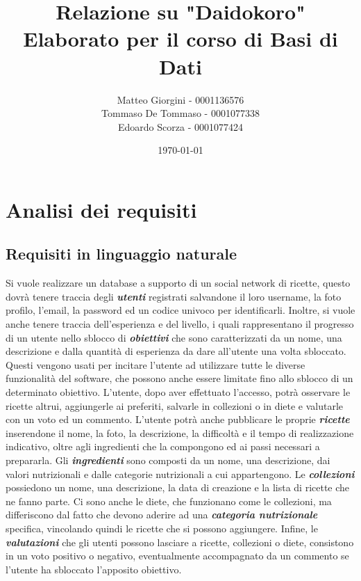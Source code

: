 ﻿\documentclass[a4paper,12pt]{report}
\title{Relazione su "Daidokoro" \\ Elaborato per il corso di Basi di Dati}
\author
{
    Matteo Giorgini - 0001136576 \\
    Tommaso De Tommaso - 0001077338 \\
    Edoardo Scorza - 0001077424 \\
}
\date{\today}
\begin{document}
\maketitle
\tableofcontents
\chapter{Analisi dei requisiti}
\section{Requisiti in linguaggio naturale}
Si vuole realizzare un database a supporto di un social network di ricette, questo dovrà tenere traccia degli \textbf{\textit{utenti}} registrati salvandone il loro username, la foto profilo, l'email, la password ed un codice univoco per identificarli.
Inoltre, si vuole anche tenere traccia dell'esperienza e del livello, i quali rappresentano il progresso di un utente nello sblocco di \textbf{\textit{obiettivi}} che sono caratterizzati da un nome, una descrizione e dalla quantità di esperienza da dare all'utente una volta sbloccato.
Questi vengono usati per incitare l'utente ad utilizzare tutte le diverse funzionalità del software, che possono anche essere limitate fino allo sblocco di un determinato obiettivo.
L'utente, dopo aver effettuato l'accesso, potrà osservare le ricette altrui, aggiungerle ai preferiti, salvarle in collezioni o in diete e valutarle con un voto ed un commento.
L'utente potrà anche pubblicare le proprie \textbf{\textit{ricette}} inserendone il nome, la foto, la descrizione, la difficoltà e il tempo di realizzazione indicativo, oltre agli ingredienti che la compongono ed ai passi necessari a prepararla.
Gli \textbf{\textit{ingredienti}} sono composti da un nome, una descrizione, dai valori nutrizionali e dalle categorie nutrizionali a cui appartengono.
Le \textbf{\textit{collezioni}} possiedono un nome, una descrizione, la data di creazione e la lista di ricette che ne fanno parte.
Ci sono anche le diete, che funzionano come le collezioni, ma differiscono dal fatto che devono aderire ad una \textbf{\textit{categoria nutrizionale}} specifica, vincolando quindi le ricette che si possono aggiungere.
Infine, le \textbf{\textit{valutazioni}} che gli utenti possono lasciare a ricette, collezioni o diete, consistono in un voto positivo o negativo, eventualmente accompagnato da un commento se l'utente ha sbloccato l'apposito obiettivo.
\\
\end{document}
